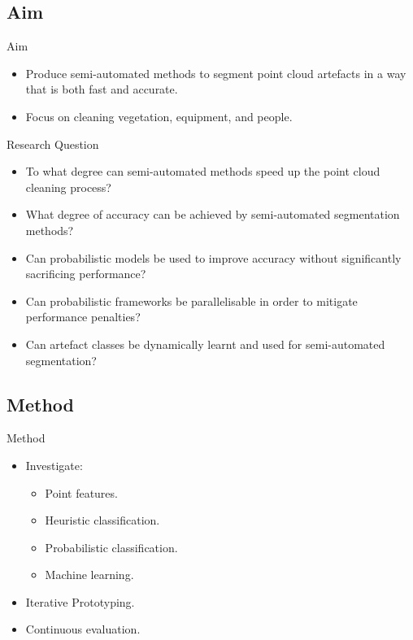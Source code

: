 \documentclass{beamer}
\begin{document}
\subsection{Aim}

\begin{frame}{Aim}
\begin{itemize}

\item
Produce semi-automated methods to segment point cloud artefacts in a way that is both fast and accurate.

\item
Focus on cleaning vegetation, equipment, and people.
\end{itemize}


\end{frame}

\begin{frame}{Research Question}

\begin{itemize}
\item To what degree can semi-automated methods speed up the point cloud cleaning process?
\item What degree of accuracy can be achieved by semi-automated segmentation methods?
\item Can probabilistic models be used to improve accuracy without significantly sacrificing performance?
\item Can probabilistic frameworks be parallelisable in order to mitigate performance penalties?  
\item Can artefact classes be dynamically learnt and used for semi-automated segmentation?
\end{itemize}

\end{frame}

\subsection{Method}

\begin{frame}{Method}

\begin{itemize}
\item Investigate:
\begin{itemize}
  \item Point features.
  \item Heuristic classification.
  \item Probabilistic classification.
  \item Machine learning.
\end{itemize}
\item Iterative Prototyping.
\item Continuous evaluation.
\end{itemize}

\end{frame}
\end{document}
